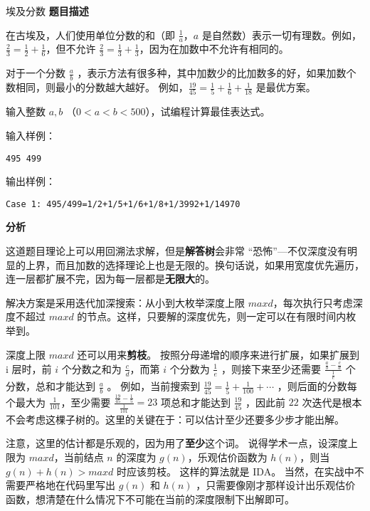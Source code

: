 \begin{NOTE}{埃及分数}{}
\textbf{题目描述}

在古埃及，人们使用单位分数的和（即 $\frac{1}{a}$，$a$ 是自然数）表示一切有理数。例如，$\frac{2}{3}=\frac{1}{2}+\frac{1}{6}$，但不允许 $\frac{2}{3}=\frac{1}{3}+\frac{1}{3}$，因为在加数中不允许有相同的。 

对于一个分数 $\frac{a}{b}$ ，表示方法有很多种，其中加数少的比加数多的好，如果加数个数相同，则最小的分数越大越好。 例如，$\frac{19}{45}=\frac{1}{5}+\frac{1}{6}+\frac{1}{18}$ 是最优方案。 

输入整数 $a,b$ （$0<a<b<500$），试编程计算最佳表达式。

输入样例：

\begin{verbatim}
495 499
\end{verbatim}

输出样例：

\begin{verbatim}
Case 1: 495/499=1/2+1/5+1/6+1/8+1/3992+1/14970
\end{verbatim}

\end{NOTE}


\textbf{分析}

这道题目理论上可以用回溯法求解，但是\textbf{解答树}会非常 “恐怖”—不仅深度没有明显的上界，而且加数的选择理论上也是无限的。换句话说，如果用宽度优先遍历，连一层都扩展不完，因为每一层都是\textbf{无限大}的。

解决方案是采用迭代加深搜索：从小到大枚举深度上限 $maxd$，每次执行只考虑深度不超过 $maxd$ 的节点。这样，只要解的深度优先，则一定可以在有限时间内枚举到。

深度上限 $maxd$ 还可以用来\textbf{剪枝}。 按照分母递增的顺序来进行扩展，如果扩展到 i 层时，前 $i$ 个分数之和为 $\frac{c}{d}$，而第 $i$ 个分数为 $\frac{1}{e}$ ，则接下来至少还需要 $\frac{\frac{a}{b}-\frac{c}{d}}{\frac{1}{e}}$ 个分数，总和才能达到 $\frac{a}{b}$ 。 例如，当前搜索到 $\frac{19}{45}=\frac{1}{5}+\frac{1}{100}+\cdots$ ，则后面的分数每个最大为 $\frac{1}{101}$，至少需要 $\frac{\frac{19}{45}-\frac{1}{5}}{\frac{1}{101}}=23$ 项总和才能达到 $\frac{19}{45}$ ，因此前 $22$ 次迭代是根本不会考虑这棵子树的。这里的关键在于：可以估计至少还要多少步才能出解。 

注意，这里的估计都是乐观的，因为用了\textbf{至少}这个词。 说得学术一点，设深度上限为 $maxd$，当前结点 $n$ 的深度为 $g(n)$，乐观估价函数为 $h(n)$，则当 $g(n)+h(n)>maxd$ 时应该剪枝。 这样的算法就是 IDA。 当然，在实战中不需要严格地在代码里写出 $g(n)$ 和 $h(n)$ ，只需要像刚才那样设计出乐观估价函数，想清楚在什么情况下不可能在当前的深度限制下出解即可。


